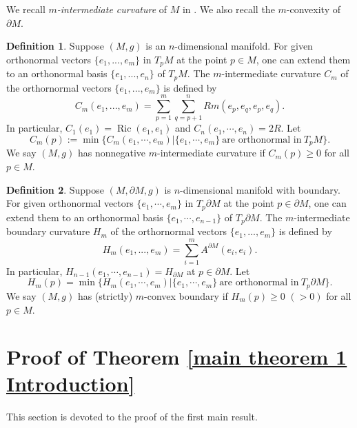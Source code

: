\documentclass[11pt,letterpaper]{amsart}
\DeclareMathOperator{\Ric}{Ric}
\newtheorem{theorem}{Theorem}[section]
\theoremstyle{definition}
\newtheorem{definition}[theorem]{Definition}
\theoremstyle{remark}
\numberwithin{equation}{section}
\begin{document}
We recall \textit{$m$-intermediate curvature} of $M$ in \cite{brendlegeroch'sconjecture}. We also recall the $m$-convexity of $\partial M$.
\begin{definition}

    Suppose $(M,g)$ is an $n$-dimensional manifold. For given orthonormal vectors $\{e_{1},...,e_{m}\}$ in $T_pM$ at the point $p\in M$, one can extend them to an orthonormal basis $\{e_{1},...,e_{n}\}$ of $T_{p}M$. 
    The $m$-intermediate curvature $C_{m}$ of the orthornormal vectors $\{e_{1},...,e_{m}\}$ is defined by
    \[
    C_{m}(e_{1},...,e_{m}) = \sum_{p=1}^{m}\sum_{q=p+1}^{n}Rm(e_{p},e_{q},e_{p},e_{q}).\]
In particular, $C_1(e_1)=\Ric(e_1,e_1)$ and $C_{n}(e_1,\cdots,e_{n})=2R.$ Let 
\[C_m(p):=\min\{C_m(e_1,\cdots,e_m)| \{e_1,\cdots,e_m\}\ \text{are orthonormal in}\ T_pM\}.\]
We say $(M,g)$ has nonnegative $m$-intermediate curvature if $C_m(p)\geq 0$ for all $p\in M.$
\end{definition}

\begin{definition}
Suppose $(M,\partial M,g)$ is $n$-dimensional manifold with boundary. For given orthonormal vectors $\{e_1,\cdots,e_m\}$ in $T_p\partial M$ at the point $p\in\partial M$, one can extend them to an orthonormal basis $\{e_1,\cdots,e_{n-1}\}$ of $T_p\partial M$. 
The $m$-intermediate boundary curvature $H_{m}$ of the orthornormal vectors $\{e_{1},...,e_{m}\}$ is defined by
\[ H_{m}(e_{1},...,e_{m}) = \sum_{i=1}^{m}A^{\partial M}(e_{i},e_{i}).
    \]
    In particular, $H_{n-1}(e_1,\cdots, e_{n-1})=H_{\partial M}$ at $p\in \partial M$. Let 
    \[H_m(p)=\min\{H_m(e_1,\cdots,e_m)| \{e_1,\cdots,e_m\}\ \text{are orthonormal in}\ T_p\partial M\}.\]
    We say $(M,g)$ has (strictly) $m$-convex boundary if $H_m(p)\geq 0$ $(>0)$ for all $p\in M.$
\end{definition}


\section{Proof of Theorem \ref{main theorem 1 Introduction}}\label{section 3}

This section is devoted to the proof of the first main result.
\end{document}
